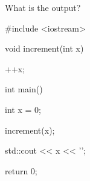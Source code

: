 What is the output?



\begin{consolethree}[escapeinside=||]

#include <iostream>



void increment(int x)

{

    ++x;

}



int main()

{

    int x = 0;

    increment(x);

    std::cout << x << '\n';

    return 0;

}

\end{consolethree}

